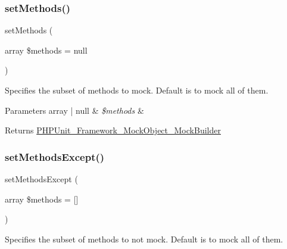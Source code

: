 \subsubsection{\texorpdfstring{set\+Methods()}{setMethods()}}
{\footnotesize\ttfamily set\+Methods (\begin{DoxyParamCaption}\item[{array}]{\$methods = {\ttfamily null} }\end{DoxyParamCaption})}

Specifies the subset of methods to mock. Default is to mock all of them.


\begin{DoxyParams}[1]{Parameters}
array | null & {\em \$methods} & \\
\hline
\end{DoxyParams}
\begin{DoxyReturn}{Returns}
\mbox{\hyperlink{class_p_h_p_unit___framework___mock_object___mock_builder}{P\+H\+P\+Unit\+\_\+\+Framework\+\_\+\+Mock\+Object\+\_\+\+Mock\+Builder}} 
\end{DoxyReturn}
\mbox{\label{class_p_h_p_unit___framework___mock_object___mock_builder_a2774343fbb87e15d47386bca1668c09a}} 
\subsubsection{\texorpdfstring{set\+Methods\+Except()}{setMethodsExcept()}}
{\footnotesize\ttfamily set\+Methods\+Except (\begin{DoxyParamCaption}\item[{array}]{\$methods = {\ttfamily \mbox{[}\mbox{]}} }\end{DoxyParamCaption})}

Specifies the subset of methods to not mock. Default is to mock all of them.


